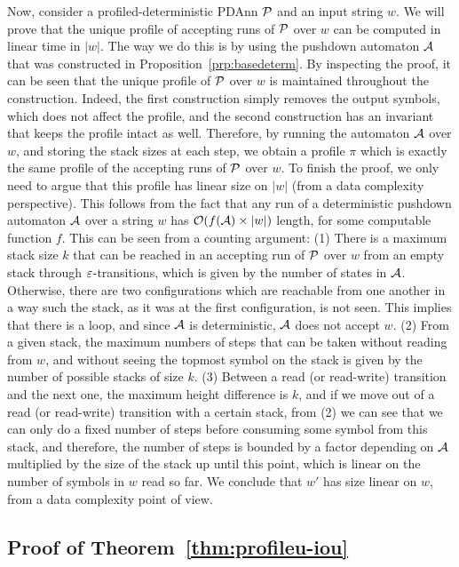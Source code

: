 Now, consider a profiled-deterministic PDAnn $\mathcal{P}$ and an input string $w$. We will prove that the unique profile of accepting runs of $\mathcal{P}$ over $w$ can be computed in linear time in $|w|$. The way we do this is by using the pushdown automaton $\mathcal{A}$ that was constructed in Proposition~\ref{prp:basedeterm}. By inspecting the proof, it can be seen that the unique profile of $\mathcal{P}$ over $w$ is maintained throughout the construction. Indeed, the first construction simply removes the output symbols, which does not affect the profile, and the second construction has an invariant that keeps the profile intact as well. Therefore, by running the automaton $\mathcal{A}$ over $w$, and storing the stack sizes at each step, we obtain a profile $\pi$ which is exactly the same profile of the accepting runs of $\mathcal{P}$ over $w$. To finish the proof, we only need to argue that this profile has linear size on $|w|$ (from a data complexity perspective). This follows from the fact that any run of a deterministic pushdown automaton $\mathcal{A}$ over a string $w$ has $\mathcal{O}(f(\mathcal{A})\times|w|)$ length, for some computable function $f$. This can be seen from a counting argument: (1) There is a maximum stack size $k$ that can be reached in an accepting run of $\mathcal{P}$ over $w$ from an empty stack through $\varepsilon$-transitions, which is given by the number of states in $\mathcal{A}$. Otherwise, there are two configurations which are reachable from one another in a way such the stack, as it was at the first configuration, is not seen. This implies that there is a loop, and since $\mathcal{A}$ is deterministic, $\mathcal{A}$ does not accept $w$. (2) From a given stack, the maximum numbers of steps that can be taken without reading from $w$, and without seeing the topmost symbol on the stack is given by the number of possible stacks of size $k$. (3) Between a read (or read-write) transition and the next one, the maximum height difference is $k$, and if we move out of a read (or read-write) transition with a certain stack, from (2) we can see that we can only do a fixed number of steps before consuming some symbol from this stack, and therefore, the number of steps is bounded by a factor depending on $\mathcal{A}$ multiplied by the size of the stack up until this point, which is linear on the number of symbols in $w$ read so far. We conclude that $w'$ has size linear on $w$, from a data complexity point of view.

\subsection{Proof of Theorem~\ref{thm:profileu-iou}}

